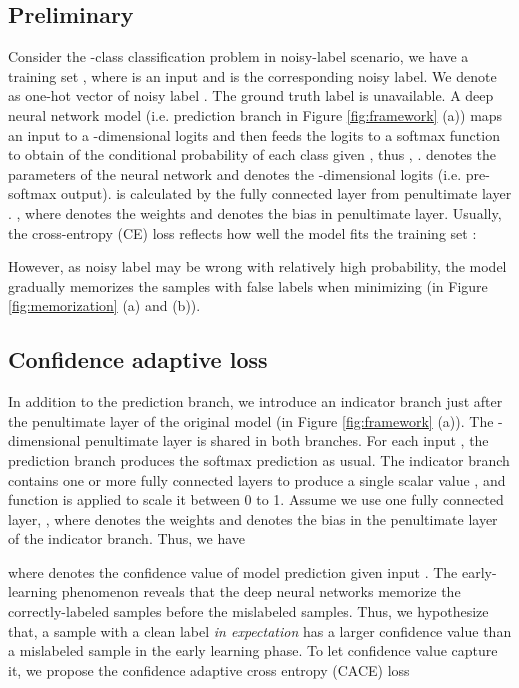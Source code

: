 \documentclass{article}
\begin{document}
\vspace{-1em}
\subsection{Preliminary}
\label{subsec:pre}
Consider the -class classification problem in noisy-label scenario, we have a training set , where  is an input and  is the corresponding noisy label. We denote  as one-hot vector of noisy label . The ground truth label  is unavailable. A deep neural network model  (i.e. prediction branch in Figure \ref{fig:framework} (a)) maps an input  to a -dimensional logits and then feeds the logits to a softmax function  to obtain  of the conditional probability of each class given , thus , .
 denotes the parameters of the neural network and  denotes the -dimensional logits (i.e. pre-softmax output).  is calculated by the fully connected layer from penultimate layer . , where  denotes the weights and  denotes the bias in penultimate layer. Usually, the cross-entropy (CE) loss reflects how well the model fits the training set :

However, as noisy label  may be wrong with relatively high probability, the model gradually memorizes the samples with false labels when minimizing  (in Figure \ref{fig:memorization} (a) and (b)).






\subsection{Confidence adaptive loss}
\label{sec:cal}
In addition to the prediction branch, we introduce an indicator branch just after the penultimate layer of the original model (in Figure \ref{fig:framework} (a)). The -dimensional penultimate layer  is shared in both branches. For each input , the prediction branch produces the softmax prediction  as usual. The indicator branch contains one or more fully connected layers to produce a single scalar value , and  function is applied to scale it between 0 to 1. Assume we use one fully connected layer, , where  denotes the weights and  denotes the bias in the penultimate layer of the indicator branch. Thus, we have

where  denotes the confidence value of model prediction given input . The early-learning phenomenon reveals that the deep neural networks memorize the correctly-labeled samples before the mislabeled samples. Thus, we hypothesize that, a sample with a clean label \emph{in expectation} has a larger confidence value than a mislabeled sample in the early learning phase. To let confidence value  capture it, we propose the confidence adaptive cross entropy (CACE) loss 
\end{document}

